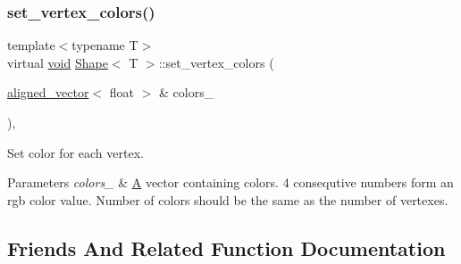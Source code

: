 \subsubsection{\texorpdfstring{set\+\_\+vertex\+\_\+colors()}{set\_vertex\_colors()}}
{\footnotesize\ttfamily template$<$typename T$>$ \\
virtual \mbox{\hyperlink{glad_8h_a950fc91edb4504f62f1c577bf4727c29}{void}} \mbox{\hyperlink{classShape}{Shape}}$<$ T $>$\+::set\+\_\+vertex\+\_\+colors (\begin{DoxyParamCaption}\item[{\mbox{\hyperlink{type__definitions_8hpp_a087efd587d66b881646ef378f1919c90}{aligned\+\_\+vector}}$<$ float $>$ \&}]{colors\+\_\+ }\end{DoxyParamCaption})\hspace{0.3cm}{\ttfamily [inline]}, {\ttfamily [virtual]}}



Set color for each vertex. 


\begin{DoxyParams}{Parameters}
{\em colors\+\_\+} & \mbox{\hyperlink{classA}{A}} vector containing colors. 4 consequtive numbers form an rgb color value. Number of colors should be the same as the number of vertexes. \\
\hline
\end{DoxyParams}


\subsection{Friends And Related Function Documentation}
\mbox{\label{classShape_a0f7d9c8330ae4f062c6f569a7400e1f0}} 
